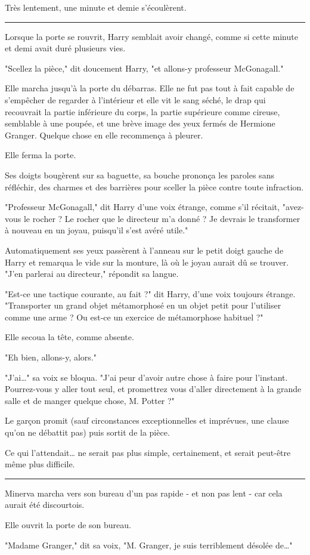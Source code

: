 Très lentement, une minute et demie s'écoulèrent.
\par\noindent\rule{\textwidth}{0.4pt}
Lorsque la porte se rouvrit, Harry semblait avoir changé, comme si cette minute et demi avait duré plusieurs vies.

"Scellez la pièce," dit doucement Harry, "et allons-y professeur McGonagall."

Elle marcha jusqu'à la porte du débarras. Elle ne fut pas tout à fait capable de s'empêcher de regarder à l'intérieur et elle vit le sang séché, le drap qui recouvrait la partie inférieure du corps, la partie supérieure comme cireuse, semblable à une poupée, et une brève image des yeux fermés de Hermione Granger. Quelque chose en elle recommença à pleurer.

Elle ferma la porte.

Ses doigts bougèrent sur sa baguette, sa bouche prononça les paroles sans réfléchir, des charmes et des barrières pour sceller la pièce contre toute infraction.

"Professeur McGonagall," dit Harry d'une voix étrange, comme s'il récitait, "avez-vous le rocher ? Le rocher que le directeur m'a donné ? Je devrais le transformer à nouveau en un joyau, puisqu'il s'est avéré utile."

Automatiquement ses yeux passèrent à l'anneau sur le petit doigt gauche de Harry et remarqua le vide sur la monture, là où le joyau aurait dû se trouver. "J'en parlerai au directeur," répondit sa langue.

"Est-ce une tactique courante, au fait ?" dit Harry, d'une voix toujours étrange. "Transporter un grand objet métamorphosé en un objet petit pour l'utiliser comme une arme ? Ou est-ce un exercice de métamorphose habituel ?"

Elle secoua la tête, comme absente.

"Eh bien, allons-y, alors."

"J'ai…" sa voix se bloqua. "J'ai peur d'avoir autre chose à faire pour l'instant. Pourrez-vous y aller tout seul, et promettrez vous d'aller directement à la grande salle et de manger quelque chose, M. Potter ?"

Le garçon promit (sauf circonstances exceptionnelles et imprévues, une clause qu'on ne débattit pas) puis sortit de la pièce.

Ce qui l'attendait… ne serait pas plus simple, certainement, et serait peut-être même plus difficile.
\par\noindent\rule{\textwidth}{0.4pt}
Minerva marcha vers son bureau d'un pas rapide - et non pas lent - car cela aurait été discourtois.

Elle ouvrit la porte de son bureau.

"Madame Granger," dit sa voix, "M. Granger, je suis terriblement désolée de…"

